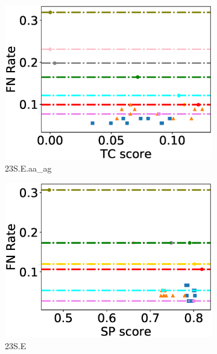 \begin{figure}[!htbp]
\begin{adjustwidth}{-0.5cm}{-0.5cm}
\begin{subfigure}{0.26\textwidth}
			\includegraphics[width=\columnwidth]{Figure/summary/precomputedInit/23S.E.aa_ag/fnrate_vs_tc}
			\caption{23S.E.aa\_ag}
\end{subfigure}
		\begin{subfigure}{0.26\textwidth}
			\includegraphics[width=\columnwidth]{Figure/summary/precomputedInit/23S.E/fnrate_vs_sp}
			\caption{23S.E}
\end{subfigure}    
		\begin{subfigure}{0.26\textwidth}

\end{subfigure}
\end{adjustwidth}
\end{figure}

